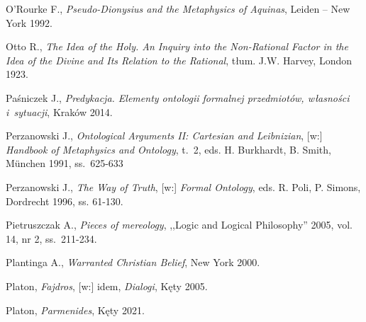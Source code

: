 \begin{thebibliography}{100}
O'Rourke F., \textit{Pseudo-Dionysius and the Metaphysics of Aquinas}, Leiden -- New York 1992.

Otto R., \textit{The Idea of the Holy. An Inquiry into the Non-Rational Factor in the Idea of the Divine and Its Relation to the Rational}, tłum. J.W. Harvey, London 1923.



Paśniczek J., \textit{Predykacja. Elementy ontologii formalnej przedmiotów, własności i~sytuacji}, Kraków 2014.

Perzanowski J., \textit{Ontological Arguments II: Cartesian and Leibnizian}, [w:] \textit{Handbook of Metaphysics and Ontology},
t.~2, eds. H. Burkhardt, B. Smith,  München 1991, ss.~625-633

Perzanowski J., \textit{The Way of Truth}, [w:] \textit{Formal Ontology}, eds. R. Poli, P. Simons, Dordrecht 1996, ss. 61-130.


Pietruszczak A., \textit{Pieces of mereology}, ,,Logic and Logical Philosophy'' 2005, vol. 14, nr 2, ss.~211-234.


Plantinga A., \textit{Warranted Christian Belief}, New York 2000.

Platon, \textit{Fajdros}, [w:] idem, \textit{Dialogi}, Kęty 2005.

Platon, \textit{Parmenides}, Kęty 2021.


\end{thebibliography}
